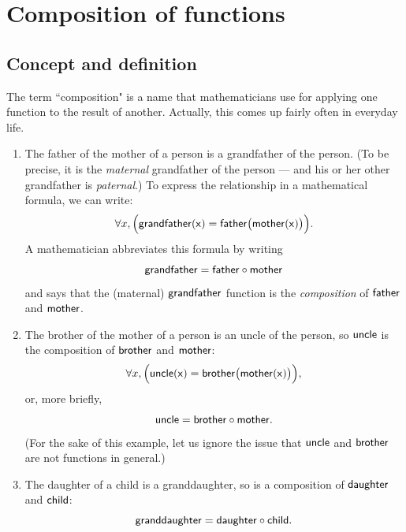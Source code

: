   
 \section{Composition of functions\quad
{}} \label{composition}
 
 \subsection{Concept and definition}


\medskip\noindent
The term ``composition" is a name that mathematicians use for applying one function to the result of another. Actually, this  comes up fairly often in everyday life.

\begin{example}{} 
\begin{enumerate}
\item The father of the mother of a person is a grandfather of the person.
 (To be precise, it is the \emph{maternal} grandfather of the person --- and his or her other grandfather is \emph{paternal}.) To express the relationship in a mathematical formula, we can write:
 $$ \forall x,  \Bigl( \sf{grandfather}(x) = \sf{father} \bigl( \sf{mother}(x) \bigr) \Bigr) .$$
 A mathematician abbreviates this formula by writing
 $$ \sf{grandfather} = \sf{father} \circ \sf{mother} $$
 and says that the (maternal) $\sf{grandfather}$ function is the \emph{composition} of $\sf{father}$ and $\sf{mother}$.
 \item The brother of the mother of a person is an uncle of the person, so $\sf{uncle}$ is the composition of $\sf{brother}$ and $\sf{mother}$:
  $$ \forall x, \Bigl( \sf{uncle}(x) = \sf{brother} \bigl( \sf{mother}(x) \bigr) \Bigr) ,$$ 
  or, more briefly,
  $$ \sf{uncle} = \sf{brother} \circ \sf{mother} .$$
 (For the sake of this example, let us ignore the issue that $\sf{uncle}$ and $\sf{brother}$ are not functions in general.)
\item The daughter of a child is a granddaughter, so  is a composition of $\sf{daughter}$ and $\sf{child}$:
$$ \sf{granddaughter} = \sf{daughter} \circ \sf{child} .$$
\end{enumerate}
\end{example}


